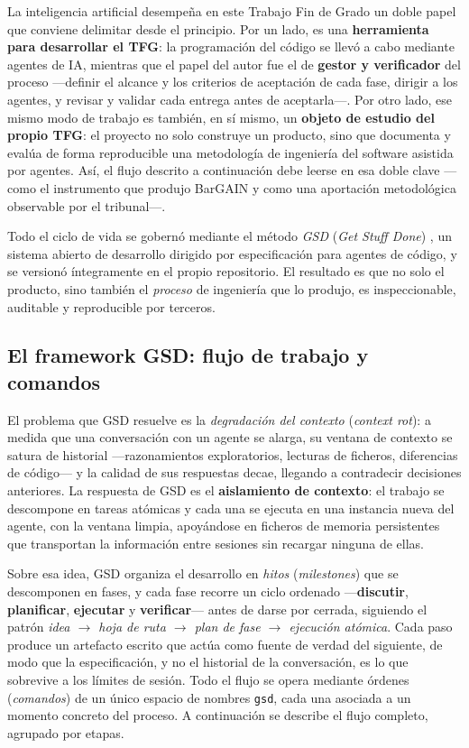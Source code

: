 La inteligencia artificial desempe\~na en este Trabajo Fin de Grado un doble papel que conviene
delimitar desde el principio. Por un lado, es una \textbf{herramienta para desarrollar el TFG}:
la programaci\'on del c\'odigo se llev\'o a cabo mediante agentes de IA, mientras que el papel del
autor fue el de \textbf{gestor y verificador} del proceso ---definir el alcance y los criterios de
aceptaci\'on de cada fase, dirigir a los agentes, y revisar y validar cada entrega antes de
aceptarla---. Por otro lado, ese mismo modo de trabajo es tambi\'en, en s\'i mismo, un
\textbf{objeto de estudio del propio TFG}: el proyecto no solo construye un producto, sino que
documenta y eval\'ua de forma reproducible una metodolog\'ia de ingenier\'ia del software asistida
por agentes. As\'i, el flujo descrito a continuaci\'on debe leerse en esa doble clave ---como el
instrumento que produjo BarGAIN y como una aportaci\'on metodol\'ogica observable por el tribunal---.

Todo el ciclo de vida se gobern\'o mediante el m\'etodo \emph{GSD} (\emph{Get Stuff Done})
\cite{gsd_repo}, un sistema abierto de desarrollo dirigido por especificaci\'on para agentes de
c\'odigo, y se version\'o \'integramente en el propio repositorio. El resultado es que no solo el
producto, sino tambi\'en el \emph{proceso} de ingenier\'ia que lo produjo, es inspeccionable,
auditable y reproducible por terceros.

\subsection{El framework GSD: flujo de trabajo y comandos}\label{subsec:gsd-flujo}

El problema que GSD resuelve es la \emph{degradaci\'on del contexto} (\emph{context rot}): a medida
que una conversaci\'on con un agente se alarga, su ventana de contexto se satura de historial
---razonamientos exploratorios, lecturas de ficheros, diferencias de c\'odigo--- y la calidad de
sus respuestas decae, llegando a contradecir decisiones anteriores. La respuesta de GSD es el
\textbf{aislamiento de contexto}: el trabajo se descompone en tareas at\'omicas y cada una se
ejecuta en una instancia nueva del agente, con la ventana limpia, apoy\'andose en ficheros de
memoria persistentes que transportan la informaci\'on entre sesiones sin recargar ninguna de ellas.

Sobre esa idea, GSD organiza el desarrollo en \emph{hitos} (\emph{milestones}) que se descomponen
en fases, y cada fase recorre un ciclo ordenado ---\textbf{discutir}, \textbf{planificar},
\textbf{ejecutar} y \textbf{verificar}--- antes de darse por cerrada, siguiendo el patr\'on
\emph{idea $\rightarrow$ hoja de ruta $\rightarrow$ plan de fase $\rightarrow$ ejecuci\'on
at\'omica}. Cada paso produce un artefacto escrito que act\'ua como fuente de verdad del siguiente,
de modo que la especificaci\'on, y no el historial de la conversaci\'on, es lo que sobrevive a los
l\'imites de sesi\'on. Todo el flujo se opera mediante \'ordenes (\emph{comandos}) de un \'unico
espacio de nombres \texttt{gsd}, cada una asociada a un momento concreto del proceso. A
continuaci\'on se describe el flujo completo, agrupado por etapas.

